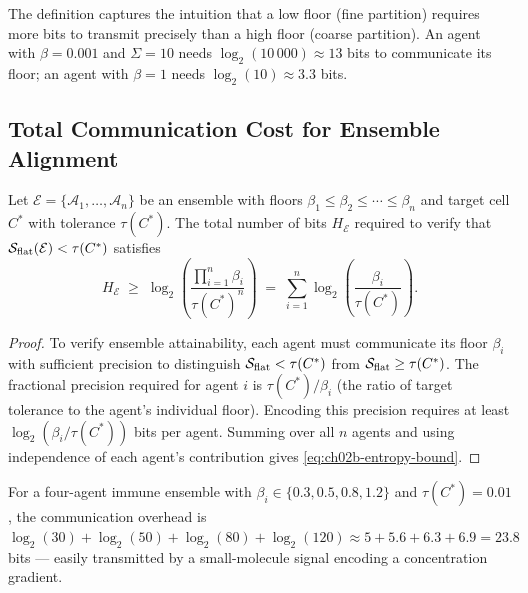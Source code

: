 The definition captures the intuition that a low floor (fine partition) requires
more bits to transmit precisely than a high floor (coarse partition).  An agent
with $\beta = 0.001$ and $\Sigma = 10$ needs $\log_2(10\,000) \approx 13$ bits
to communicate its floor; an agent with $\beta = 1$ needs $\log_2(10) \approx
3.3$ bits.

\subsection{Total Communication Cost for Ensemble Alignment}

\begin{theorem}
\label{thm:ch02b-communication-overhead}
Let $\mathcal{E} = \{\mathcal{A}_1, \ldots, \mathcal{A}_n\}$ be an ensemble
with floors $\beta_1 \leq \beta_2 \leq \cdots \leq \beta_n$ and target cell
$C^*$ with tolerance $\tau(C^*)$.  The total number of bits $H_\mathcal{E}$
required to verify that $\mathcal{S}_{\mathrm{flat}}(\mathcal{E}) < \tau(C^*)$
satisfies
\begin{equation}
  H_\mathcal{E}
  \;\geq\;
  \log_2\!\left(\frac{\prod_{i=1}^n \beta_i}{\tau(C^*)^n}\right)
  \;=\;
  \sum_{i=1}^n \log_2\!\left(\frac{\beta_i}{\tau(C^*)}\right).
  \label{eq:ch02b-entropy-bound}
\end{equation}
\end{theorem}

\begin{proof}
To verify ensemble attainability, each agent must communicate its floor
$\beta_i$ with sufficient precision to distinguish $\mathcal{S}_{\mathrm{flat}} <
\tau(C^*)$ from $\mathcal{S}_{\mathrm{flat}} \geq \tau(C^*)$.  The fractional
precision required for agent $i$ is $\tau(C^*)/\beta_i$ (the ratio of target
tolerance to the agent's individual floor).  Encoding this precision requires
at least $\log_2(\beta_i/\tau(C^*))$ bits per agent.  Summing over all $n$
agents and using independence of each agent's contribution gives
\eqref{eq:ch02b-entropy-bound}.
\end{proof}

\begin{remark}
For a four-agent immune ensemble with $\beta_i \in \{0.3, 0.5, 0.8, 1.2\}$
and $\tau(C^*) = 0.01$, the communication overhead is
$\log_2(30) + \log_2(50) + \log_2(80) + \log_2(120) \approx 5 + 5.6 + 6.3 + 6.9
= 23.8$ bits — easily transmitted by a small-molecule signal encoding a
concentration gradient.
\end{remark}

